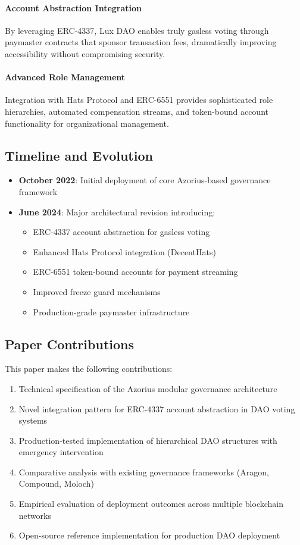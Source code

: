 \paragraph{Account Abstraction Integration} By leveraging ERC-4337, Lux DAO enables truly gasless voting through paymaster contracts that sponsor transaction fees, dramatically improving accessibility without compromising security.

\paragraph{Advanced Role Management} Integration with Hats Protocol and ERC-6551 provides sophisticated role hierarchies, automated compensation streams, and token-bound account functionality for organizational management.

\subsection{Timeline and Evolution}

\begin{itemize}
    \item \textbf{October 2022}: Initial deployment of core Azorius-based governance framework
    \item \textbf{June 2024}: Major architectural revision introducing:
    \begin{itemize}
        \item ERC-4337 account abstraction for gasless voting
        \item Enhanced Hats Protocol integration (DecentHats)
        \item ERC-6551 token-bound accounts for payment streaming
        \item Improved freeze guard mechanisms
        \item Production-grade paymaster infrastructure
    \end{itemize}
\end{itemize}

\subsection{Paper Contributions}

This paper makes the following contributions:

\begin{enumerate}
    \item Technical specification of the Azorius modular governance architecture
    \item Novel integration pattern for ERC-4337 account abstraction in DAO voting systems
    \item Production-tested implementation of hierarchical DAO structures with emergency intervention
    \item Comparative analysis with existing governance frameworks (Aragon, Compound, Moloch)
    \item Empirical evaluation of deployment outcomes across multiple blockchain networks
    \item Open-source reference implementation for production DAO deployment
\end{enumerate}

